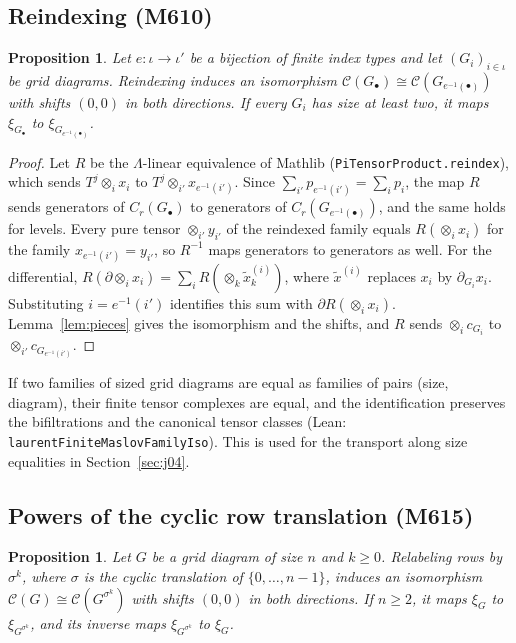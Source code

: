 \documentclass[11pt]{amsart}
\newtheorem{proposition}[theorem]{Proposition}
\theoremstyle{definition}
\theoremstyle{remark}
\newcommand{\lean}[1]{\textnormal{\nolinkurl{#1}}}
\newcommand{\Lam}{\Lambda}
\newcommand{\cC}{\mathcal{C}}
\begin{document}
\subsection{Reindexing (M610)}

\begin{proposition}\label{prop:reindex}
Let $e\colon\iota\to\iota'$ be a bijection of finite index types and let $(G_i)_{i\in\iota}$ be grid
diagrams. Reindexing induces an isomorphism $\cC(G_\bullet)\cong\cC(G_{e^{-1}(\bullet)})$ with
shifts $(0,0)$ in both directions. If every $G_i$ has size at least two, it maps $\xi_{G_\bullet}$
to $\xi_{G_{e^{-1}(\bullet)}}$.
\end{proposition}

\begin{proof}
Let $R$ be the $\Lam$-linear equivalence of Mathlib (\lean{PiTensorProduct.reindex}), which sends
$T^j\otimes_ix_i$ to $T^j\otimes_{i'}x_{e^{-1}(i')}$. Since
$\sum_{i'}p_{e^{-1}(i')}=\sum_ip_i$, the map $R$ sends generators of $C_r(G_\bullet)$ to generators
of $C_r(G_{e^{-1}(\bullet)})$, and the same holds for levels. Every pure tensor
$\otimes_{i'}y_{i'}$ of the reindexed family equals $R(\otimes_ix_i)$ for the family
$x_{e^{-1}(i')}=y_{i'}$, so $R^{-1}$ maps generators to generators as well. For the differential,
$R(\partial\otimes_ix_i)=\sum_iR(\otimes_k\tilde x^{(i)}_k)$, where $\tilde x^{(i)}$ replaces $x_i$ by
$\partial_{G_i}x_i$. Substituting $i=e^{-1}(i')$ identifies this sum with
$\partial R(\otimes_ix_i)$. Lemma~\ref{lem:pieces} gives the isomorphism and the shifts, and $R$
sends $\otimes_ic_{G_i}$ to $\otimes_{i'}c_{G_{e^{-1}(i')}}$.
\end{proof}

If two families of sized grid diagrams are equal as families of pairs (size, diagram), their
finite tensor complexes are equal, and the identification preserves the bifiltrations and the
canonical tensor classes (Lean: \lean{laurentFiniteMaslovFamilyIso}). This is used for the
transport along size equalities in Section~\ref{sec:j04}.

\subsection{Powers of the cyclic row translation (M615)}

\begin{proposition}\label{prop:rows}
Let $G$ be a grid diagram of size $n$ and $k\ge0$. Relabeling rows by $\sigma^k$, where $\sigma$ is
the cyclic translation of $\{0,\dots,n-1\}$, induces an isomorphism
$\cC(G)\cong\cC(G^{\sigma^k})$ with shifts $(0,0)$ in both directions. If $n\ge2$, it maps $\xi_G$
to $\xi_{G^{\sigma^k}}$, and its inverse maps $\xi_{G^{\sigma^k}}$ to $\xi_G$.
\end{proposition}
\end{document}
